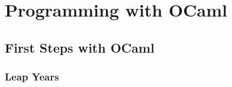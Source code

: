 \documentclass[]{book}
\begin{document}
\tableofcontents

\part{Programming with OCaml}

\chapter{First Steps with OCaml}

\section{Leap Years}


\cleardoublepage
{}\label{index}
\small\printindex
\end{document}
